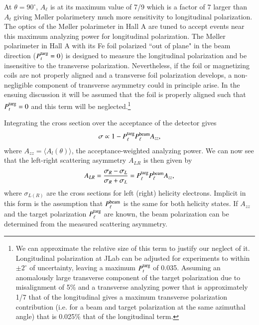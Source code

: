 \documentclass[preprint,12pt]{elsarticle}
\begin{document}
At $\theta=90^\circ$, $A_{\ell}$ is at its maximum value of 7/9 which is a factor of 7 larger than $A_t$ giving M\o ller polarimetery much more sensitivity to longitudinal polarization. The optics of the M\o ller polarimeter in Hall A are tuned to accept events near this maximum analyzing power for longitudinal polarization. The M\o ller polarimeter in Hall A with its Fe foil polarized ``out of plane" in the beam direction ($P^{\rm targ}_t=0$) is designed to measure the longitudinal polarization and be insensitive to the transverse polarization. Nevertheless, if the foil or magnetizing coils are not properly aligned and a transverse foil polarization develops, a non-negligible component of transverse asymmetry could in principle arise. In the ensuing discussion it will be assumed that the foil is properly aligned such that $P^{\rm targ}_t=0$ and this term will be neglected.\footnote{We can approximate the relative size of this term to justify our neglect of it. Longitudinal polarization at JLab can be adjusted for experiments to within $\pm2^\circ$ of uncertainty, leaving a maximum $P^{\rm targ}_t$ of 0.035. Assuming an anomalously large transverse component of the target polarization due to misalignment of 5\% and a transverse analyzing power that is approximately 1/7 that of the longitudinal gives a maximum transverse polarization contribution (i.e. for a beam and target polarization at the same azimuthal angle) that is 0.025\% that of the longitudinal term.}

Integrating the cross section over the acceptance of the detector gives 
\[
\sigma \propto1-P^{\rm targ}_{\ell}P^{\rm beam}_{\ell}A_{zz},
\]
where $A_{zz}=\langle A_l(\theta)\rangle$, the acceptance-weighted analyzing power. We can now see that the left-right scattering asymmetry $A_{LR}$ is then given by 
\begin{equation}
A_{LR}=\frac{\sigma_R-\sigma_L}{\sigma_R+\sigma_L}=P^{\rm targ}_{\ell}P^{\rm beam}_{\ell}A_{zz},
\label{eq:A_LR}
\end{equation}
where $\sigma_{L(R)}$ are the cross sections for left (right) helicity electrons. Implicit in this form is the assumption that $P_\ell^{\rm beam}$ is the same for both helicity states. If $A_{zz}$ and the target polarization $P_{\ell}^{\rm targ}$ are known, the beam polarization can be determined from the measured scattering asymmetry. 
\end{document}

